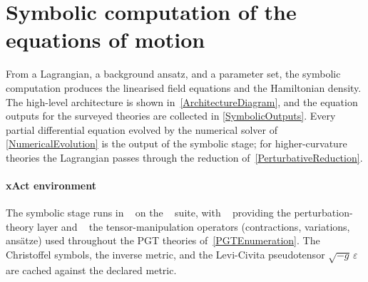 
\section{Symbolic computation of the equations of motion}%
\label{SymbolicComputation}

From a Lagrangian, a background ansatz, and a parameter set, the
symbolic computation produces the linearised
field equations and the Hamiltonian density.
The high-level architecture is shown in~\cref{ArchitectureDiagram},
and the equation outputs for the surveyed theories are collected in
\cref{SymbolicOutputs}.
Every partial differential equation evolved by the numerical solver of
\cref{NumericalEvolution} is the output of the symbolic stage; for
higher-curvature theories the Lagrangian passes through
the reduction of~\cref{PerturbativeReduction}.

\paragraph*{xAct environment}
The symbolic stage runs in \Mathematica{}~\cite{mathematica} on the
\xAct{}~\cite{martingarcia2007xact} suite, with
\xPert{}~\cite{brizuela2009xpert} providing the perturbation-theory
layer and \xTras{}~\cite{nutma2014xtras} the tensor-manipulation
operators (contractions, variations, ans\"atze) used throughout the
PGT theories of~\cref{PGTEnumeration}.
The Christoffel symbols, the inverse metric, and the Levi-Civita
pseudotensor $\sqrt{-g}\,\varepsilon$ are cached against the declared metric.

